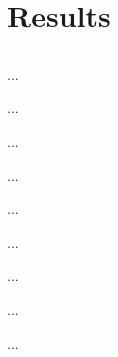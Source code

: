 \documentclass[usenames,dvipsnames]{beamer}
\begin{document}
\section{Results}
\subsection{}

\begin{frame}{ ... }

\end{frame}


\begin{frame}{ ... }

\end{frame}


\begin{frame}{ ... }

\end{frame}


\begin{frame}{ ... }

\end{frame}


\begin{frame}{ ... }

\end{frame}



\begin{frame}{ ... }

\end{frame}


\begin{frame}{ ... }

\end{frame}


\begin{frame}{ ... }

\end{frame}


\begin{frame}{ ... }

\end{frame}




\end{document}

